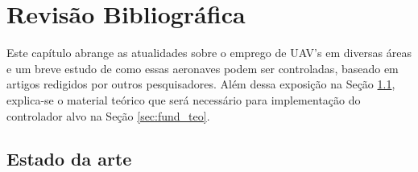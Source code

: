 \documentclass[main.tex]{subfiles}
\begin{document}
\chapter{Revisão Bibliográfica}
\label{chap:revisao}

Este capítulo abrange as atualidades sobre o emprego de UAV's em diversas áreas e um breve estudo de como essas aeronaves podem ser controladas, baseado em artigos redigidos por outros pesquisadores. Além dessa exposição na Seção \ref{sec:estado_arte}, explica-se o material teórico que será necessário para implementação do controlador alvo na Seção \ref{sec:fund_teo}. 

\section{Estado da arte}\label{sec:estado_arte}






\end{document}
